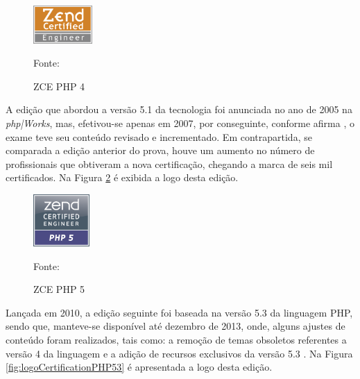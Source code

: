 \begin{figure}[h!tb]
	\caption{ZCE PHP 4}
	\label{fig:logoCertificationPHP4}

	\centering
	\includegraphics[width=0.2\textwidth]{images/logo/php4.png}

	\centering
	\footnotesize Fonte: 
\end{figure}

\FloatBarrier 	%

A edição que abordou a versão 5.1 da tecnologia foi anunciada no ano de
2005 na \textit{php|Works}, mas, efetivou-se apenas em 2007, por conseguinte,
conforme afirma , o exame teve seu conteúdo
revisado e incrementado. Em contrapartida, se comparada a edição anterior do
prova, houve um aumento no número de profissionais que obtiveram a nova
certificação, chegando a marca de seis mil certificados. Na Figura
\ref{fig:logoCertificationPHP5} é exibida a logo desta edição.

\begin{figure}[h!tb]
	\caption{ZCE PHP 5}
	\label{fig:logoCertificationPHP5}

	\centering
	\includegraphics[width=0.19\textwidth]{images/logo/php5.png}

	\centering
	\footnotesize Fonte: 
\end{figure}

\FloatBarrier 	%

Lançada em 2010, a edição seguinte foi baseada na versão 5.3 da linguagem
\acs{PHP}, sendo que, manteve-se disponível até dezembro de 2013, onde, alguns ajustes de
conteúdo foram realizados, tais como: a remoção de temas obsoletos referentes a versão 4
da linguagem e a adição de recursos exclusivos da versão 5.3
\cite{entrevistaAriZCEBrasil}. Na Figura \ref{fig:logoCertificationPHP53} é
apresentada a logo desta edição.

